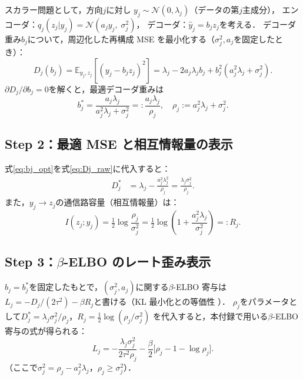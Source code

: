 \documentclass[11pt,a4paper]{jsarticle}
\begin{document}
スカラー問題として，方向$j$に対し
$y_j \sim \mathcal{N}(0, \lambda_j)$（データの第$j$主成分），
エンコーダ：$q_j(z_j | y_j) = \mathcal{N}(a_j y_j,\; \sigma_j^2)$，
デコーダ：$\hat{y}_j = b_j z_j$を考える．
デコーダ重み$b_j$について，周辺化した再構成 MSE を最小化する（$\sigma_j^2, a_j$を固定したとき）：
\begin{equation}
  D_j(b_j) = \mathbb{E}_{y_j, z_j}[(y_j - b_j z_j)^2]
  = \lambda_j - 2 a_j \lambda_j b_j + b_j^2 (a_j^2 \lambda_j + \sigma_j^2).
  \label{eq:Dj_raw}
\end{equation}
$\partial D_j / \partial b_j = 0$を解くと，最適デコーダ重みは
\begin{equation}
  b_j^* = \frac{a_j \lambda_j}{a_j^2 \lambda_j + \sigma_j^2}
         =: \frac{a_j \lambda_j}{\rho_j},
  \quad \rho_j := a_j^2 \lambda_j + \sigma_j^2.
  \label{eq:bj_opt}
\end{equation}

\subsection*{Step 2：最適 MSE と相互情報量の表示}

式\eqref{eq:bj_opt}を式\eqref{eq:Dj_raw}に代入すると：
\begin{align}
  D_j^* &= \lambda_j - \frac{a_j^2 \lambda_j^2}{\rho_j}
          = \frac{\lambda_j \sigma_j^2}{\rho_j}.
  \label{eq:Dj_opt}
\end{align}
また，$y_j \to z_j$の通信路容量（相互情報量）は：
\begin{equation}
  I(z_j; y_j) = \tfrac{1}{2}\log\frac{\rho_j}{\sigma_j^2}
              = \tfrac{1}{2}\log\!\left(1 + \frac{a_j^2 \lambda_j}{\sigma_j^2}\right)
              =: R_j.
  \label{eq:Rj}
\end{equation}

\subsection*{Step 3：$\beta$-ELBO のレート歪み表示}

$b_j = b_j^*$を固定したもとで，$(\sigma_j^2, a_j)$に関する$\beta$-ELBO 寄与は
$L_j = -D_j/(2\tau^2) - \beta R_j$と書ける（KL 最小化との等価性 \cite{cover2006elements}）．
$\rho_j$をパラメータとして$D_j^* = \lambda_j \sigma_j^2/\rho_j$，$R_j = \tfrac{1}{2}\log(\rho_j/\sigma_j^2)$
を代入すると，本付録で用いる$\beta$-ELBO 寄与の式が得られる：
\begin{equation}
  L_j = -\frac{\lambda_j \sigma_j^2}{2\tau^2 \rho_j}
        - \frac{\beta}{2}\bigl[\rho_j - 1 - \log \rho_j\bigr].
  \label{eq:elbo_j}
\end{equation}
（ここで$\sigma_j^2 = \rho_j - a_j^2\lambda_j$，$\rho_j \geq \sigma_j^2$）．
\end{document}
